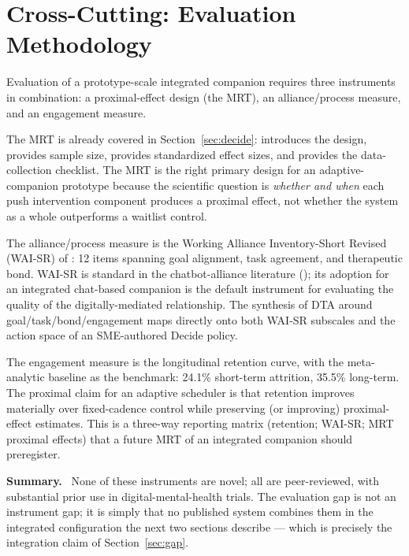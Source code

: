 \documentclass[10pt,conference]{article}
\newcommand{\secref}[1]{Section~\ref{#1}}
\renewcommand{\paragraph}[1]{\smallskip\par\noindent\textbf{#1}~\ignorespaces}
\begin{document}
\section{Cross-Cutting: Evaluation Methodology}\label{sec:evaluation}

Evaluation of a prototype-scale integrated companion requires three
instruments in combination: a proximal-effect design (the MRT), an
alliance/process measure, and an engagement measure.

The MRT is already covered in \secref{sec:decide}: \cite{Klasnja2015MRT}
introduces the design, \cite{Liao2016MRTSampleSize} provides sample
size, \cite{Luers2018StandardizedEffect} provides standardized
effect sizes, and \cite{Seewald2019MRTData} provides the
data-collection checklist. The MRT is the right primary design for an
adaptive-companion prototype because the scientific question is
\emph{whether and when} each push intervention component produces a
proximal effect, not whether the system as a whole outperforms a
waitlist control.

The alliance/process measure is the Working Alliance
Inventory-Short Revised (WAI-SR) of \cite{Hatcher2006WAISR}: 12 items
spanning goal alignment, task agreement, and therapeutic bond. WAI-SR
is standard in the chatbot-alliance literature
(\cite{Henson2019DTA,Lederman2021DTASpecialIssue,MalouinLachance2025DTAReview});
its adoption for an integrated chat-based companion is the default
instrument for evaluating the quality of the digitally-mediated
relationship. The \cite{MalouinLachance2025DTAReview} synthesis of DTA
around goal/task/bond/engagement maps directly onto both WAI-SR
subscales and the action space of an SME-authored Decide policy.

The engagement measure is the longitudinal retention curve, with the
\cite{Linardon2020Attrition} meta-analytic baseline as the benchmark:
24.1\% short-term attrition, 35.5\% long-term. The proximal claim for
an adaptive scheduler is that retention improves materially over
fixed-cadence control while preserving (or improving) proximal-effect
estimates. This is a three-way reporting matrix (retention; WAI-SR;
MRT proximal effects) that a future MRT of an integrated companion
should preregister.

\paragraph{Summary.} None of these instruments are novel; all are
peer-reviewed, with substantial prior use in digital-mental-health
trials. The evaluation gap is not an instrument gap; it is simply
that no published system combines them in the integrated configuration
the next two sections describe --- which is precisely the integration
claim of \secref{sec:gap}.
\end{document}
